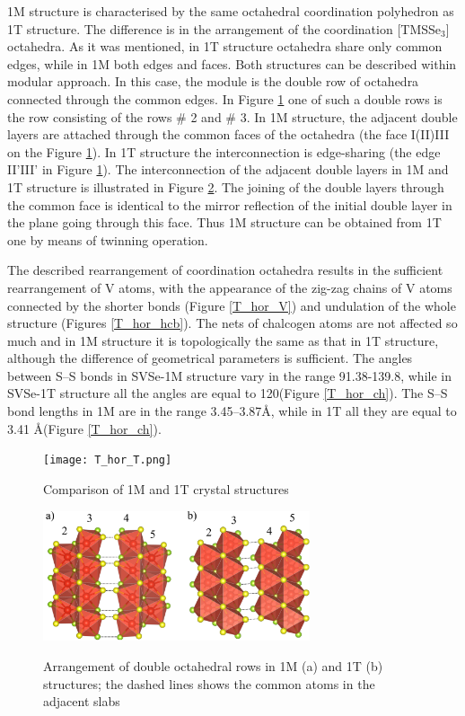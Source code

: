\documentclass[a4paperm]{article}
\begin{document}
1M structure is characterised by the same octahedral coordination polyhedron as 1T structure.
The difference is in the arrangement of the coordination [TMSSe$_3$] octahedra.
As it was mentioned, in 1T structure octahedra share only common edges, while in 1M both edges and faces.
Both structures can be described within modular approach.
In this case, the module is the double row of octahedra connected through the common edges.
In Figure \ref{T_hor_T} one of such a double rows is the row consisting of the rows \# 2 and \# 3.
In 1M structure, the adjacent double layers are attached through the common faces  of the octahedra (the face I(II)III on the Figure \ref{T_hor_T}).
In 1T structure the interconnection is edge-sharing (the edge II'III' in Figure \ref{T_hor_T}). 
The interconnection of the adjacent double layers in 1M and 1T structure is illustrated in  Figure \ref{T_hor_slabs}.
The joining of the double layers through the common face is identical to the mirror reflection of the initial double layer in the plane going through this face.
Thus 1M structure can be obtained from 1T one by means of twinning operation.


The described rearrangement of coordination octahedra results in the sufficient rearrangement of V atoms, with the appearance of the zig-zag chains of V atoms connected by the shorter bonds (Figure \ref{T_hor_V}) and undulation of the whole structure (Figures \ref{T_hor_hcb}).
The nets of chalcogen atoms are not affected so much and in 1M structure it is topologically the same as that in 1T structure, although the difference of geometrical parameters is sufficient.
The angles between S--S bonds in SVSe-1M structure vary in the range 91.38-139.8\textdegree, while in SVSe-1T structure all the angles are equal to 120\textdegree (Figure \ref{T_hor_ch}).
The S--S bond lengths in 1M are in the range 3.45--3.87\AA, while in 1T all they are equal to 3.41 \AA (Figure \ref{T_hor_ch}).


\begin{figure}[H]
	\texttt{[image: T\_hor\_T.png]} \\
	\caption{Comparison of 1M and 1T crystal structures}
	\label{T_hor_T}
\end{figure}

\begin{figure}[H]
	\includegraphics[width=0.7\textwidth]{T_hor_slabs.png} \\
	\caption{Arrangement of double octahedral rows in 1M (a) and 1T (b) structures; the dashed lines shows the common atoms in the adjacent slabs}
	\label{T_hor_slabs}
\end{figure}
\end{document}
